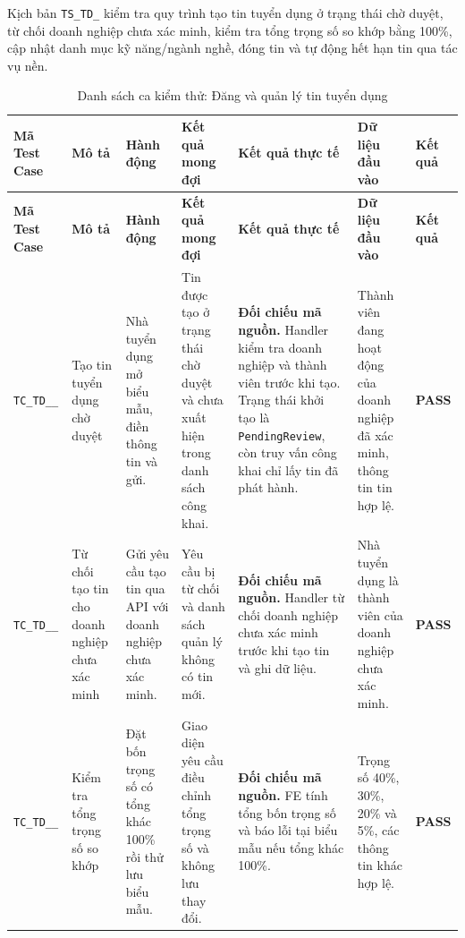 \begin{landscape}
Kịch bản \texttt{TS\_\allowbreak TD\_} kiểm tra quy trình tạo tin tuyển dụng ở trạng thái chờ duyệt, từ chối doanh nghiệp chưa xác minh, kiểm tra tổng trọng số so khớp bằng 100\%, cập nhật danh mục kỹ năng/ngành nghề, đóng tin và tự động hết hạn tin qua tác vụ nền.

{
\fontsize{9.5}{11.5}\selectfont
\setlength{\tabcolsep}{3pt}
\renewcommand{\arraystretch}{1.2}
\begin{longtable}{|>{\raggedright\arraybackslash}p{2.1cm}|>{\raggedright\arraybackslash}p{2.8cm}|>{\raggedright\arraybackslash}p{3.8cm}|>{\raggedright\arraybackslash}p{4.0cm}|>{\raggedright\arraybackslash}p{5.0cm}|>{\raggedright\arraybackslash}p{3.2cm}|>{\centering\arraybackslash}p{1.3cm}|}
    \caption{Danh sách ca kiểm thử: Đăng và quản lý tin tuyển dụng} \label{tab:ts-td-03} \\
    \hline
    \textbf{Mã Test Case} & \textbf{Mô tả} & \textbf{Hành động} & \textbf{Kết quả mong đợi} & \textbf{Kết quả thực tế} & \textbf{Dữ liệu đầu vào} & \textbf{Kết quả} \\
    \hline
    \endfirsthead
    \hline
    \textbf{Mã Test Case} & \textbf{Mô tả} & \textbf{Hành động} & \textbf{Kết quả mong đợi} & \textbf{Kết quả thực tế} & \textbf{Dữ liệu đầu vào} & \textbf{Kết quả} \\
    \hline
    \endhead
    \hline
    \endfoot
    \hline
    \endlastfoot
    \texttt{TC\_\allowbreak TD\_\allowbreak 03\_\allowbreak 01} & Tạo tin tuyển dụng chờ duyệt & Nhà tuyển dụng mở biểu mẫu, điền thông tin và gửi. & Tin được tạo ở trạng thái chờ duyệt và chưa xuất hiện trong danh sách công khai. & \textbf{Đối chiếu mã nguồn.} Handler kiểm tra doanh nghiệp và thành viên trước khi tạo. Trạng thái khởi tạo là \texttt{PendingReview}, còn truy vấn công khai chỉ lấy tin đã phát hành. & Thành viên đang hoạt động của doanh nghiệp đã xác minh, thông tin tin hợp lệ. & \textbf{PASS} \\
    \hline
    \texttt{TC\_\allowbreak TD\_\allowbreak 03\_\allowbreak 02} & Từ chối tạo tin cho doanh nghiệp chưa xác minh & Gửi yêu cầu tạo tin qua API với doanh nghiệp chưa xác minh. & Yêu cầu bị từ chối và danh sách quản lý không có tin mới. & \textbf{Đối chiếu mã nguồn.} Handler từ chối doanh nghiệp chưa xác minh trước khi tạo tin và ghi dữ liệu. & Nhà tuyển dụng là thành viên của doanh nghiệp chưa xác minh. & \textbf{PASS} \\
    \hline
    \texttt{TC\_\allowbreak TD\_\allowbreak 03\_\allowbreak 03} & Kiểm tra tổng trọng số so khớp & Đặt bốn trọng số có tổng khác 100\% rồi thử lưu biểu mẫu. & Giao diện yêu cầu điều chỉnh tổng trọng số và không lưu thay đổi. & \textbf{Đối chiếu mã nguồn.} FE tính tổng bốn trọng số và báo lỗi tại biểu mẫu nếu tổng khác 100\%. & Trọng số 40\%, 30\%, 20\% và 5\%, các thông tin khác hợp lệ. & \textbf{PASS} \\

\end{longtable}}
\end{landscape}
